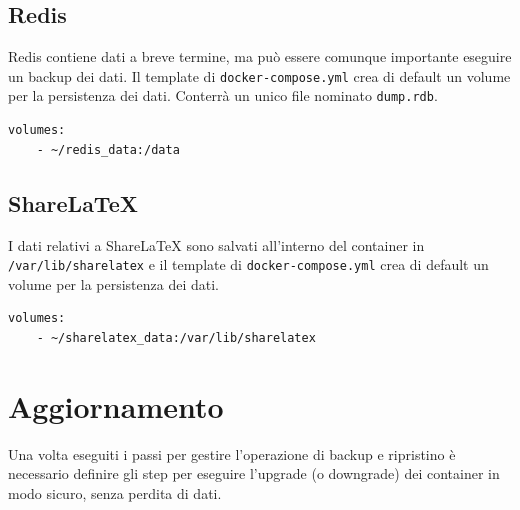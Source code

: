 \subsection{Redis}
Redis contiene dati a breve termine, ma può essere comunque importante eseguire un backup dei dati. Il template di \verb|docker-compose.yml| crea di default un volume per la persistenza dei dati. Conterrà un unico file nominato \verb|dump.rdb|.
\begin{lstlisting}
volumes:
    - ~/redis_data:/data
\end{lstlisting}

\subsection{ShareLaTeX}
I dati relativi a ShareLaTeX sono salvati all'interno del container in \verb|/var/lib/sharelatex| e il template di \verb|docker-compose.yml| crea di default un volume per la persistenza dei dati.
\begin{lstlisting}
volumes:
    - ~/sharelatex_data:/var/lib/sharelatex
\end{lstlisting}

\section{Aggiornamento}
Una volta eseguiti i passi per gestire l'operazione di backup e ripristino è necessario definire gli step per eseguire l'upgrade (o downgrade) dei container in modo sicuro, senza perdita di dati.

